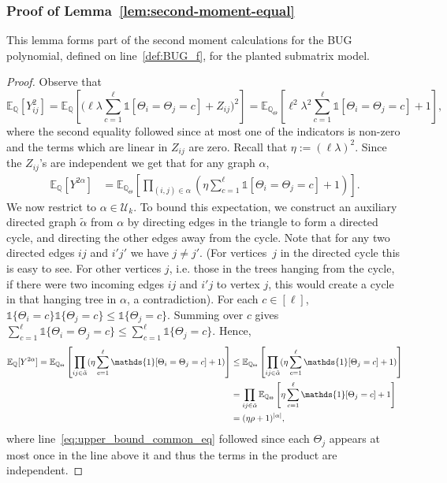 \documentclass[11pt, letterpaper]{article}
\numberwithin{equation}{section}
\newcommand{\E}{\mathbb{E}}
\newcommand{\QQ}{\mathbb{Q}}
\newcommand{\cU}{\mathcal{U}}
\begin{document}
\subsubsection{Proof of Lemma~\ref{lem:second-moment-equal}}
 This lemma forms part of the second moment calculations for the BUG polynomial, defined on line~\eqref{def:BUG_f}, for the planted submatrix model.
\begin{proof}
%
Observe that \begin{equation*}\label{eq.linear_in_Z_trick}
\mathbb{E}_\QQ[Y_{ij}^2] = \mathbb{E}_\QQ[ \big( \ell \lambda\sum_{c=1}^\ell \mathds{1}[\Theta_i = \Theta_j = c] + Z_{ij}\big)^2 ] =
\mathbb{E}_{\QQ_\Theta}[ \ell^2 \lambda^2 \sum_{c=1}^\ell \mathds{1}[\Theta_i = \Theta_j = c] + 1 ],
\end{equation*}
where the second equality followed since at most one of the indicators is non-zero and the terms which are linear in $Z_{ij}$ are zero.
Recall that $\eta:=(\ell\lambda)^2$. Since the $Z_{ij}$'s are independent we get that for any graph $\alpha$,
\begin{equation}
\label{eq:equal-eta-comparison}
\begin{aligned}
\E_\QQ[Y^{2\alpha}]
&= \E_{\QQ_\Theta} \left[\prod_{(i,j) \in \alpha} (\eta \sum_{c=1}^\ell \mathds{1}[\Theta_i = \Theta_j = c] + 1) \right]. 
\end{aligned}
\end{equation}
\noindent 
We now restrict to $\alpha \in \cU_k$.
To bound this expectation, we construct an auxiliary directed graph $\tilde{\alpha}$ from $\alpha$ by directing edges in the triangle to form a directed cycle, and directing the other edges away from the cycle. Note that for any two directed edges $ij$ and $i'j'$ we have $j\neq j'$. (For vertices~$j$ in the directed cycle this is easy to see. For other vertices $j$, i.e. those in the trees hanging from the cycle, if there were two incoming edges $ij$ and $i'j$ to vertex $j$, this would create a cycle in that hanging tree in $\alpha$, a contradiction).
For each $c\in[\ell]$,
$\mathds{1}\{\Theta_i=c\}\mathds{1}\{\Theta_j=c\}
\le
\mathds{1}\{\Theta_j=c\}.$
Summing over $c$ gives
$
\sum_{c=1}^{\ell}\mathds{1}\{\Theta_i=\Theta_j=c\}
\le
\sum_{c=1}^{\ell}\mathds{1}\{\Theta_j=c\}
$. Hence, 
%
\begin{align}
\E_\QQ[Y^{2\alpha}]
= \notag \E_{\QQ_\Theta} \left[\prod_{ij \in \tilde{\alpha}} (\eta  \sum_{c=1}^\ell \mathds{1}[\Theta_i = \Theta_j = c] + 1) \right] &\leq \notag \E_{\QQ_\Theta} \left[\prod_{ij \in \tilde{\alpha}} (\eta   \sum_{c=1}^\ell \mathds{1}[\Theta_j = c] + 1) \right]\\
\label{eq:upper_bound_common_eq} &= \prod_{ij \in \tilde{\alpha}} \E_{\QQ_\Theta} \left[ \eta \sum_{c=1}^\ell \mathds{1}[\Theta_j = c] + 1 \right]  \\
\notag &= (\eta\rho+1)^{|\alpha|},
\end{align}
where line~\eqref{eq:upper_bound_common_eq} followed since each $\Theta_j$ appears at most once in the line above it and thus the terms in the product are independent. 
\end{proof}
\end{document}
